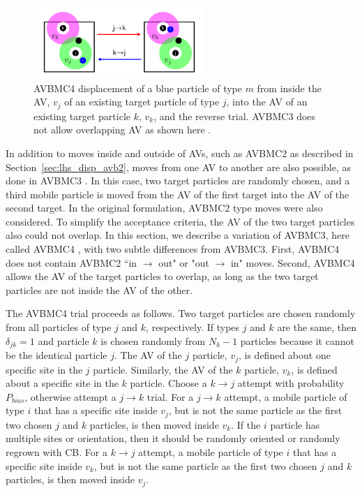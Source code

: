 \documentclass[
  9pt,
  bestpractices,
]{livecoms}
\begin{document}
\begin{figure}
\begin{centering}
\includegraphics[width=6.5cm]{../figures/avb4.pdf}
\caption{
AVBMC4 displacement of a blue particle of type $m$ from inside the AV, $v_j$ of an existing target particle of type $j$, into the AV of an existing target particle $k$, $v_k$, and the reverse trial.
AVBMC3 does not allow overlapping AV as shown here \cite{chen_improving_2001}.
}
\label{fig:avbmc4}
\end{centering}
\end{figure}

In addition to moves inside and outside of AVs, such as AVBMC2 as described in Section~\ref{sec:lhs_disp_avb2}, moves from one AV to another are also possible, as done in AVBMC3 \cite{chen_improving_2001}.
In this case, two target particles are randomly chosen, and a third mobile particle is moved from the AV of the first target into the AV of the second target.
In the original formulation, AVBMC2 type moves were also considered.
To simplify the acceptance criteria, the AV of the two target particles also could not overlap.
In this section, we describe a variation of AVBMC3, here called AVBMC4 \cite{siderius_flat-histogram_2024}, with two subtle differences from AVBMC3.
First, AVBMC4 does not contain AVBMC2 ``in $\rightarrow$ out" or "out $\rightarrow$ in" moves.
Second, AVBMC4 allows the AV of the target particles to overlap, as long as the two target particles are not inside the AV of the other.

The AVBMC4 trial proceeds as follows.
Two target particles are chosen randomly from all particles of type $j$ and $k$, respectively.
If types $j$ and $k$ are the same, then $\delta_{jk}=1$ and particle $k$ is chosen randomly from $N_k-1$ particles because it cannot be the identical particle $j$.
The AV of the $j$ particle, $v_j$, is defined about one specific site in the $j$ particle.
Similarly, the AV of the $k$ particle, $v_k$, is defined about a specific site in the $k$ particle.
Choose a $k\rightarrow j$ attempt with probability $P_{bias}$, otherwise attempt a $j\rightarrow k$ trial.
For a $j\rightarrow k$ attempt, a mobile particle of type $i$ that has a specific site inside $v_j$, but is not the same particle as the first two chosen $j$ and $k$ particles, is then moved inside $v_k$.
If the $i$ particle has multiple sites or orientation, then it should be randomly oriented or randomly regrown with CB.
For a $k\rightarrow j$ attempt, a mobile particle of type $i$ that has a specific site inside $v_k$, but is not the same particle as the first two chosen $j$ and $k$ particles, is then moved inside $v_j$.
\end{document}
